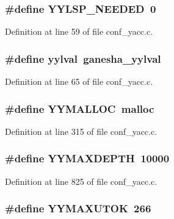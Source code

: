 \subsubsection[{YYLSP\_\-NEEDED}]{\setlength{\rightskip}{0pt plus 5cm}\#define YYLSP\_\-NEEDED~0}\label{conf__yacc_8c_bb3943553c2b5e911c89a3ea973d3079}




Definition at line 59 of file conf\_\-yacc.c.
\subsubsection[{yylval}]{\setlength{\rightskip}{0pt plus 5cm}\#define {\bf yylval}~{\bf ganesha\_\-yylval}}\label{conf__yacc_8c_75acfb3798e577ebd296e604e422e86b}




Definition at line 65 of file conf\_\-yacc.c.
\subsubsection[{YYMALLOC}]{\setlength{\rightskip}{0pt plus 5cm}\#define YYMALLOC~malloc}\label{conf__yacc_8c_573b05852d8f080c907dfba725773d7a}




Definition at line 315 of file conf\_\-yacc.c.
\subsubsection[{YYMAXDEPTH}]{\setlength{\rightskip}{0pt plus 5cm}\#define YYMAXDEPTH~10000}\label{conf__yacc_8c_14ba2b263c446ffed1c888c4b42ae40c}




Definition at line 825 of file conf\_\-yacc.c.
\subsubsection[{YYMAXUTOK}]{\setlength{\rightskip}{0pt plus 5cm}\#define YYMAXUTOK~266}\label{conf__yacc_8c_f3f5ed4bc4517eff0ef1b17541192a58}




